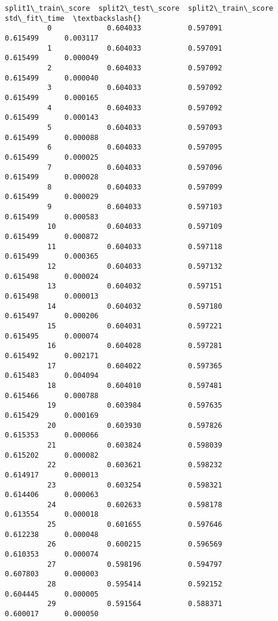 \documentclass[11pt]{article}
\begin{document}
\begin{Verbatim}[commandchars=\\\{\}]
              split1\_train\_score  split2\_test\_score  split2\_train\_score  std\_fit\_time  \textbackslash{}
          0             0.604033           0.597091            0.615499      0.003117   
          1             0.604033           0.597091            0.615499      0.000049   
          2             0.604033           0.597092            0.615499      0.000040   
          3             0.604033           0.597092            0.615499      0.000165   
          4             0.604033           0.597092            0.615499      0.000143   
          5             0.604033           0.597093            0.615499      0.000088   
          6             0.604033           0.597095            0.615499      0.000025   
          7             0.604033           0.597096            0.615499      0.000028   
          8             0.604033           0.597099            0.615499      0.000029   
          9             0.604033           0.597103            0.615499      0.000583   
          10            0.604033           0.597109            0.615499      0.000872   
          11            0.604033           0.597118            0.615499      0.000365   
          12            0.604033           0.597132            0.615498      0.000024   
          13            0.604032           0.597151            0.615498      0.000013   
          14            0.604032           0.597180            0.615497      0.000206   
          15            0.604031           0.597221            0.615495      0.000074   
          16            0.604028           0.597281            0.615492      0.002171   
          17            0.604022           0.597365            0.615483      0.004094   
          18            0.604010           0.597481            0.615466      0.000788   
          19            0.603984           0.597635            0.615429      0.000169   
          20            0.603930           0.597826            0.615353      0.000066   
          21            0.603824           0.598039            0.615202      0.000082   
          22            0.603621           0.598232            0.614917      0.000013   
          23            0.603254           0.598321            0.614406      0.000063   
          24            0.602633           0.598178            0.613554      0.000018   
          25            0.601655           0.597646            0.612238      0.000048   
          26            0.600215           0.596569            0.610353      0.000074   
          27            0.598196           0.594797            0.607803      0.000003   
          28            0.595414           0.592152            0.604445      0.000005   
          29            0.591564           0.588371            0.600017      0.000050   
          

\end{Verbatim}
\end{document}
